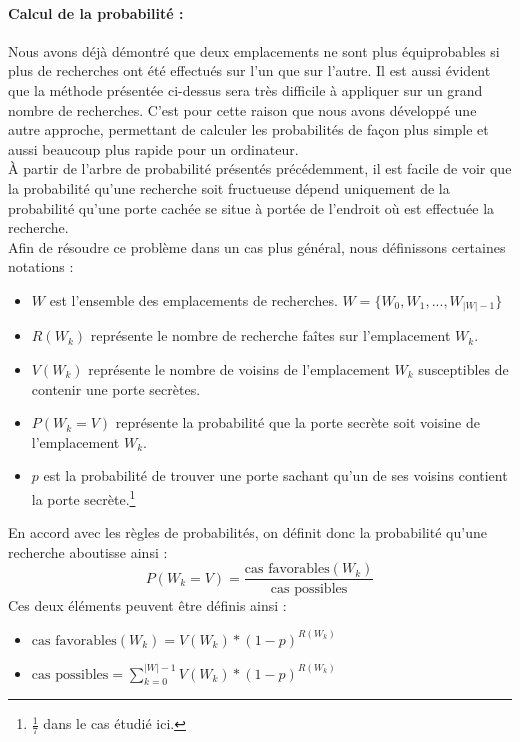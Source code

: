 \documentclass[a4paper,12pt]{article}
\begin{document}
\paragraph{Calcul de la probabilité :}
Nous avons déjà démontré que deux emplacements ne sont plus équiprobables si
plus de recherches ont été effectués sur l'un que sur l'autre. Il est aussi
évident que la méthode présentée ci-dessus sera très difficile à appliquer sur
un grand nombre de recherches. C'est pour cette raison que nous avons développé
une autre approche, permettant de calculer les probabilités de façon plus simple
et aussi beaucoup plus rapide pour un ordinateur.\\
À partir de l'arbre de probabilité présentés précédemment, il est facile de voir
que la probabilité qu'une recherche soit fructueuse dépend uniquement de la
probabilité qu'une porte cachée se situe à portée de l'endroit où est effectuée
la recherche.
\\
Afin de résoudre ce problème dans un cas plus général, nous définissons
certaines notations :
\begin{itemize}
\item $W$ est l'ensemble des emplacements de recherches.
  $W = \{W_0,W_1, ... , W_{|W| -1} \}$
\item $R(W_k)$ représente le nombre de recherche faîtes sur l'emplacement $W_k$.
\item $V(W_k)$ représente le nombre de voisins de l'emplacement $W_k$
  susceptibles de contenir une porte secrètes.
\item $P(W_k = V)$ représente la probabilité que la porte secrète soit voisine
  de l'emplacement $W_k$.
\item $p$ est la probabilité de trouver une porte sachant qu'un de ses voisins
  contient la porte secrète.\footnote{$\frac{1}{7}$ dans le cas étudié ici.}
\end{itemize}

En accord avec les règles de probabilités, on définit donc la probabilité
qu'une recherche aboutisse ainsi :
$$P(W_k = V) = \frac{\text{cas favorables}(W_k)}{\text{cas possibles}}$$
Ces deux éléments peuvent être définis ainsi :
\begin{itemize}
\item $\text{cas favorables}(W_k) = V(W_k) * (1-p)^{R(W_k)}$
\item $\text{cas possibles} = \sum\limits_{k=0}^{|W| - 1}{V(W_k) * (1-p)^{R(W_k)}}$
\end{itemize}
\end{document}
